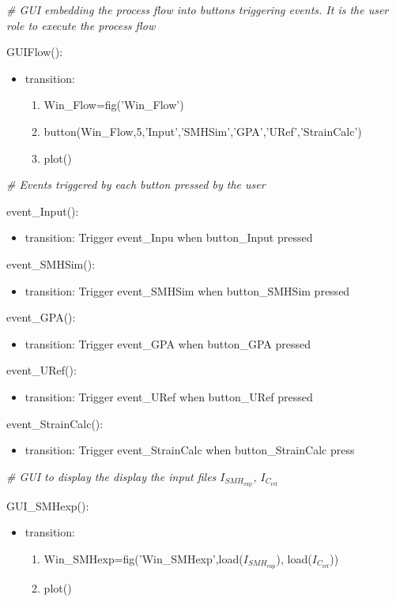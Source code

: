 \documentclass[12pt, titlepage]{article}
\begin{document}
\noindent\textit{{\#} GUI embedding the process flow into buttons triggering events. It is the user role to execute the process flow}\medskip

\noindent GUIFlow():
\begin{itemize}
\item transition: 
	\begin{enumerate}
	\item Win{\_}Flow=fig('Win{\_}Flow') 
	\item button(Win{\_}Flow,5,'Input','SMHSim','GPA','URef','StrainCalc') 
	\item plot()
	\end{enumerate} 
\end{itemize}
\bigskip

\noindent\textit{{\#} Events triggered by each button pressed by the user}\medskip

\noindent event{\_}Input():
\begin{itemize}
\item transition: Trigger event{\_}Inpu when button{\_}Input pressed
\end{itemize}
\bigskip
\noindent event{\_}SMHSim():
\begin{itemize}
\item transition: Trigger event{\_}SMHSim when button{\_}SMHSim pressed
\end{itemize}
\bigskip
\noindent event{\_}GPA():
\begin{itemize}
\item transition: Trigger event{\_}GPA when button{\_}GPA pressed
\end{itemize}
\bigskip
\noindent event{\_}URef():
\begin{itemize}
\item transition: Trigger event{\_}URef when button{\_}URef pressed
\end{itemize}
\bigskip
\noindent event{\_}StrainCalc():
\begin{itemize}
\item transition: Trigger event{\_}StrainCalc when button{\_}StrainCalc press
\end{itemize}
\bigskip

\noindent\textit{{\#} GUI to display the display the input files $I_{\mathit{SMH}_{\text{exp}}}$, $I_{C_{\text{ref}}}$}\medskip

\noindent GUI{\_}SMHexp():
\begin{itemize}
\item transition: 
	\begin{enumerate}
	\item Win{\_}SMHexp=fig('Win{\_}SMHexp',load($I_{\mathit{SMH}_{\text{exp}}}$), load($I_{C_{\text{ref}}}$))
	\item plot()
	\end{enumerate} 
\end{itemize}
\bigskip
\end{document}
